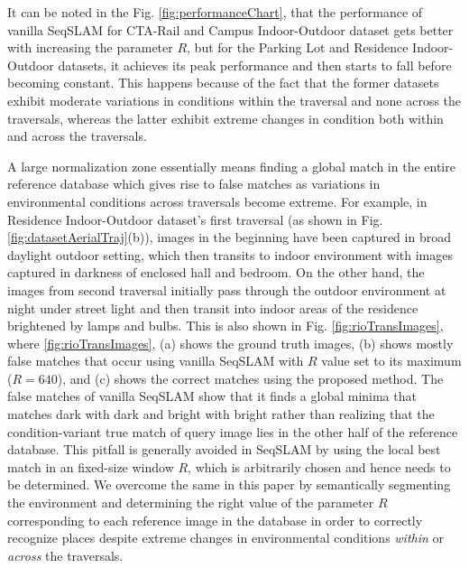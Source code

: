 \documentclass[letterpaper, 10 pt, conference]{ieeeconf}  %
\begin{document}
It can be noted in the Fig. \ref{fig:performanceChart}, that the performance of vanilla SeqSLAM for CTA-Rail and Campus Indoor-Outdoor dataset gets better with increasing the parameter $R$, but for the Parking Lot and Residence Indoor-Outdoor datasets, it achieves its peak performance and then starts to fall before becoming constant. This happens because of the fact that the former datasets exhibit moderate variations in conditions within the traversal and none across the traversals, whereas the latter exhibit extreme changes in condition both within and across the traversals. 

A large normalization zone essentially means finding a global match in the entire reference database which gives rise to false matches as variations in environmental conditions across traversals become extreme. For example, in Residence Indoor-Outdoor dataset's first traversal (as shown in Fig. \ref{fig:datasetAerialTraj}(b)), images in the beginning have been captured in broad daylight outdoor setting, which then transits to indoor environment with images captured in darkness of enclosed hall and bedroom. On the other hand, the images from second traversal initially pass through the outdoor environment at night under street light and then transit into indoor areas of the residence brightened by lamps and bulbs. This is also shown in Fig. \ref{fig:rioTransImages}, where \ref{fig:rioTransImages}, (a) shows the ground truth images, (b) shows mostly false matches that occur using vanilla SeqSLAM with $R$ value set to its maximum ($R=640$), and (c) shows the correct matches using the proposed method. The false matches of vanilla SeqSLAM show that it finds a global minima that matches dark with dark and bright with bright rather than realizing that the condition-variant true match of query image lies in the other half of the reference database. This pitfall is generally avoided in SeqSLAM by using the local best match in an fixed-size window $R$, which is arbitrarily chosen and hence needs to be determined. We overcome the same in this paper by semantically segmenting the environment and determining the right value of the parameter $R$ corresponding to each reference image in the database in order to correctly recognize places despite extreme changes in environmental conditions \emph{within} or \emph{across} the traversals.

\end{document}
